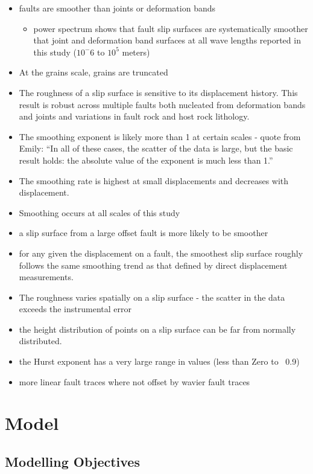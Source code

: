 \documentclass[12pt,a4paper]{article}
\begin{document}
\begin{itemize}
\begin{itemize}
\item faults are smoother than joints or deformation bands
	\begin{itemize}
		\item power spectrum shows that fault slip surfaces are systematically smoother that joint and deformation band surfaces  at all wave lengths reported in this study ($10^-6$ to $10^5$ meters)
	\end{itemize}
\item At the grains scale, grains are truncated
\item The roughness of a slip surface is sensitive to its displacement history. This result is robust across multiple faults both nucleated from deformation bands and joints and variations in fault rock and host rock lithology.
\item The smoothing exponent is likely more than 1 at certain scales - quote from Emily: ``In all of these cases, the scatter of the data is large, but the basic result holds: the absolute value of the exponent is much less than 1.''
\item The smoothing rate is highest at small displacements and decreases with displacement.
\item Smoothing occurs at all scales of this study
\item a slip surface from a large offset fault is more likely to be smoother
\item for any given the displacement on a fault, the smoothest slip surface roughly follows the same smoothing trend as that defined by direct displacement measurements. 
\item The roughness varies spatially on a slip surface - the scatter in the data exceeds the instrumental error
\item the height distribution of points on a slip surface can be far from normally distributed.
\item the Hurst exponent has a very large range in values (less than Zero to ~0.9)
\item more linear fault traces where not offset by wavier fault traces

\end{itemize}

\section{Model}
	\subsection{Modelling Objectives}

\end{itemize}
\end{document}
